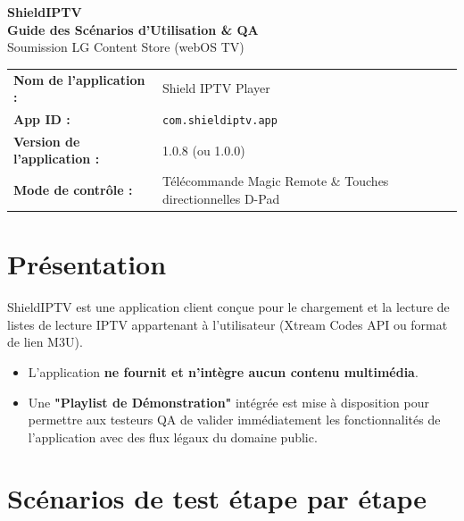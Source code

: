 \documentclass[11pt,a4paper]{article}
\begin{document}
\begin{center}
    \vspace*{10pt}
    {\Huge \textbf{Shield\textcolor{primary}{IPTV}}} \\[5pt]
    {\Large \textbf{Guide des Scénarios d'Utilisation \& QA}} \\[5pt]
    {\large Soumission LG Content Store (webOS TV)}
    \vspace{20pt}
\end{center}

\begin{tcolorbox}[colback=light, colframe=border, arc=6px, boxrule=1pt]
\begin{tabular}{ll}
    \textbf{Nom de l'application :} & Shield IPTV Player \\
    \textbf{App ID :} & \texttt{com.shieldiptv.app} \\
    \textbf{Version de l'application :} & 1.0.8 (ou 1.0.0) \\
    \textbf{Mode de contrôle :} & Télécommande Magic Remote \& Touches directionnelles D-Pad
\end{tabular}
\end{tcolorbox}

\vspace{15pt}

\section{Présentation}
ShieldIPTV est une application client conçue pour le chargement et la lecture de listes de lecture IPTV appartenant à l'utilisateur (Xtream Codes API ou format de lien M3U).
\begin{itemize}[label=\textbullet]
    \item L'application \textbf{ne fournit et n'intègre aucun contenu multimédia}.
    \item Une \textbf{"Playlist de Démonstration"} intégrée est mise à disposition pour permettre aux testeurs QA de valider immédiatement les fonctionnalités de l'application avec des flux légaux du domaine public.
\end{itemize}

\vspace{15pt}

\section{Scénarios de test étape par étape}
\end{document}
